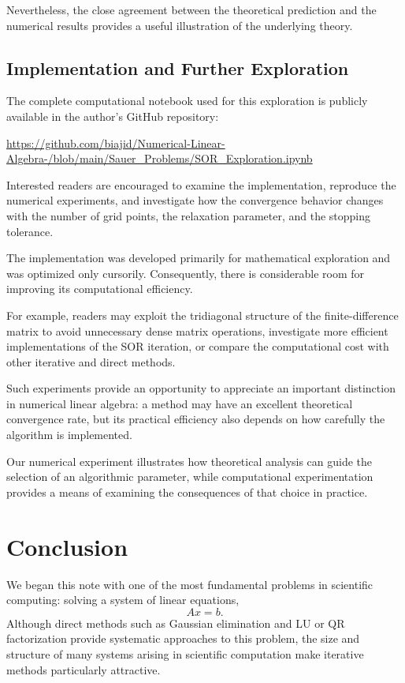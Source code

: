 \documentclass[11pt,a4paper]{article}
\theoremstyle{definition}
\theoremstyle{remark}
\begin{document}
Nevertheless, the close agreement
between the theoretical prediction
and the numerical results provides
a useful illustration of the
underlying theory.

\subsection{Implementation and Further Exploration}

The complete computational notebook
used for this exploration is publicly
available in the author's GitHub
repository:

\begin{center}
\url{https://github.com/biajid/Numerical-Linear-Algebra-/blob/main/Sauer_Problems/SOR_Exploration.ipynb}
\end{center}

Interested readers are encouraged
to examine the implementation,
reproduce the numerical experiments,
and investigate how the convergence
behavior changes with the number
of grid points, the relaxation
parameter, and the stopping tolerance.

The implementation was developed
primarily for mathematical exploration
and was optimized only cursorily.
Consequently, there is considerable
room for improving its computational
efficiency.

For example, readers may exploit
the tridiagonal structure of the
finite-difference matrix to avoid
unnecessary dense matrix operations,
investigate more efficient
implementations of the SOR iteration,
or compare the computational cost
with other iterative and direct
methods.

Such experiments provide an
opportunity to appreciate an
important distinction in numerical
linear algebra: a method may have
an excellent theoretical convergence
rate, but its practical efficiency
also depends on how carefully
the algorithm is implemented.

Our numerical experiment illustrates
how theoretical analysis can guide
the selection of an algorithmic
parameter, while computational
experimentation provides a means
of examining the consequences
of that choice in practice.


\section{Conclusion}

We began this note with one of the most fundamental
problems in scientific computing: solving a
system of linear equations,
\[
    Ax=b.
\]
Although direct methods such as Gaussian elimination
and LU or QR factorization provide systematic approaches
to this problem, the size and structure of many
systems arising in scientific computation make
iterative methods particularly attractive.
\end{document}
